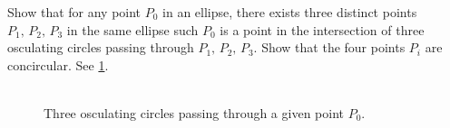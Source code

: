 \begin{exercise}
Show that  for any point $P_0$ in an ellipse, there exists three distinct points  $P_1,\, P_2,\, P_3$  in   the same ellipse such $P_0$ is a point in the intersection of three osculating circles passing through  $P_1,\, P_2,\, P_3$. Show that the four points $P_i$ are concircular.
See \cref{fig:09-3osculador}.

\end{exercise}

\begin{figure}
    \centering
    \includegraphics[width=0.7]{ii_chap_09/pics/pics_09_210_3osculador.pdf}
    \caption{Three osculating circles passing through a given point $P_0$.}
    \label{fig:09-3osculador}
\end{figure}
    
 